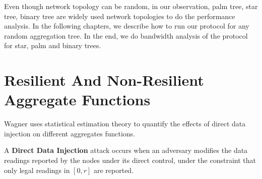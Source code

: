 	Even though network topology can be random, in our observation, palm tree, star tree, binary tree are widely used network topologies to do the performance analysis.
	In the following chapters, we describe how to run our protocol for any random aggregation tree.
	In the end, we do bandwidth analysis of the protocol for star, palm and binary trees.

\section{Resilient And Non-Resilient Aggregate Functions}
	
	Wagner \cite{wagner2004resilient} uses statistical estimation theory to quantify the effects of direct data injection on different aggregates functions.

	\begin{definition}
		\label{def:direct-data-injection}
		\cite{chan2006secure} A \textbf{Direct Data Injection} attack occurs when an adversary modifies the data readings reported by the nodes under its direct control, under the constraint that only legal readings in $[0, r]$ are reported.
	\end{definition}

